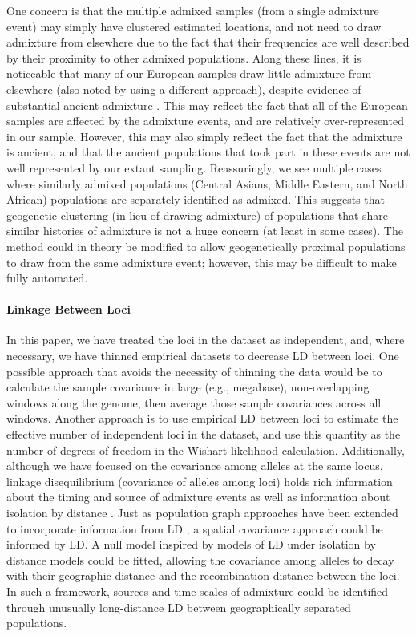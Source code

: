 \documentclass[10pt,letterpaper]{article}
\begin{document}
One concern is that the multiple admixed samples (from a single admixture event) may simply have clustered estimated locations, 
and not need to draw admixture from elsewhere due to the fact that their frequencies are well described by their proximity to other admixed populations.  
Along these lines, it is noticeable that many of our European samples draw little admixture from elsewhere (also noted by \cite{Hellenthal} using a different approach), 
despite evidence of substantial ancient admixture \cite{lazaridis_ancient_2014}.
This may reflect the fact that all of the European samples are affected by the admixture events, and are relatively over-represented in our sample. 
However, this may also simply reflect the fact that the admixture is ancient, 
and that the ancient populations that took part in these events are not well represented by our extant sampling. 
Reassuringly, we see multiple cases where similarly admixed populations (Central Asians, Middle Eastern, and North African) 
populations are separately identified as admixed. 
This suggests that geogenetic clustering (in lieu of drawing admixture) of populations that share similar histories of admixture is not a huge concern 
(at least in some cases). 
The method could in theory be modified to allow geogenetically proximal populations to draw from the same admixture event;
however, this may be difficult to make fully automated.

\paragraph{Linkage Between Loci}
In this paper, we have treated the loci in the dataset as independent, and,
where necessary, we have thinned empirical datasets to decrease LD between loci.
One possible approach that avoids the necessity of thinning the data would be to 
calculate the sample covariance in large (e.g., megabase), non-overlapping windows along the genome,
then average those sample covariances across all windows.
Another approach is to use empirical LD between loci to estimate the effective number of independent
loci in the dataset, and use this quantity as the number of degrees of freedom in the Wishart likelihood calculation.
Additionally, although we have focused on the covariance among alleles at the same locus, 
linkage disequilibrium (covariance of alleles among loci) 
holds rich information about the timing and source of admixture events \cite{chakraborty_admixture_1988,moorjani_india_2013, Hellenthal,gravel_population_2012} 
as well as information about isolation by distance \cite{ralph2013geography}.
Just as population graph approaches have been extended to incorporate information from LD \cite{Loh:13}, 
a spatial covariance approach could be informed by LD. 
A null model inspired by models of LD under isolation by distance models \cite{Arkendra2007,Barton2013} could be fitted, 
allowing the covariance among alleles to decay with their geographic distance and the recombination distance between the loci. 
In such a framework, sources and time-scales of admixture could be identified through unusually long-distance LD between geographically separated populations. 
\end{document}
